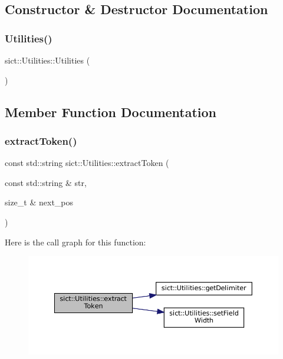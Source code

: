 \subsection{Constructor \& Destructor Documentation}
\mbox{\label{classsict_1_1Utilities_a2e0687de6ca32d2dbe8c1a4a26eb96ed}} 
\subsubsection{\texorpdfstring{Utilities()}{Utilities()}}
{\footnotesize\ttfamily sict\+::\+Utilities\+::\+Utilities (\begin{DoxyParamCaption}{ }\end{DoxyParamCaption})}



\subsection{Member Function Documentation}
\mbox{\label{classsict_1_1Utilities_adf1116c6b7b95d9bfb3f8e1a24065703}} 
\subsubsection{\texorpdfstring{extractToken()}{extractToken()}}
{\footnotesize\ttfamily const std\+::string sict\+::\+Utilities\+::extract\+Token (\begin{DoxyParamCaption}\item[{const std\+::string \&}]{str,  }\item[{size\+\_\+t \&}]{next\+\_\+pos }\end{DoxyParamCaption})}

Here is the call graph for this function\+:
\nopagebreak
\begin{figure}[H]
\begin{center}
\leavevmode
\includegraphics[width=350pt]{classsict_1_1Utilities_adf1116c6b7b95d9bfb3f8e1a24065703_cgraph}
\end{center}
\end{figure}
\mbox{\label{classsict_1_1Utilities_acb2dd78a1790aea2af76bda8235d05e0}} 
